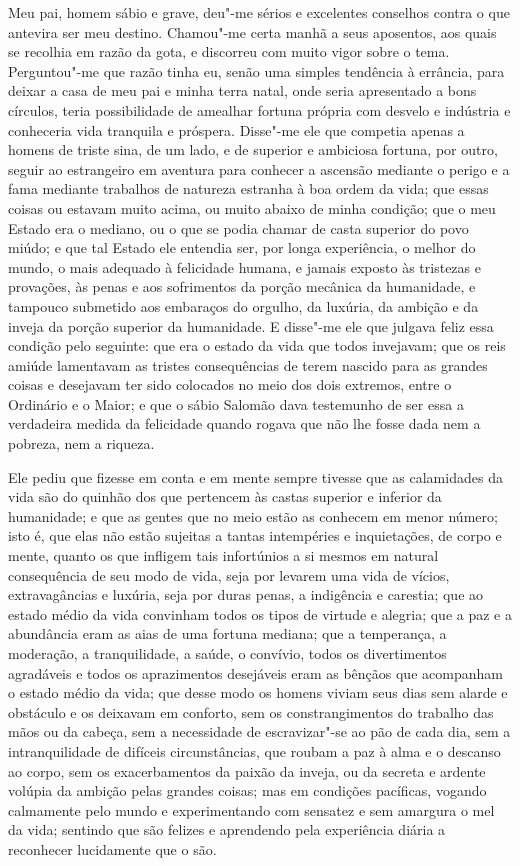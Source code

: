 Meu pai, homem sábio e grave, deu"-me sérios e excelentes conselhos
contra o que antevira ser meu destino. Chamou"-me certa manhã a seus
aposentos, aos quais se recolhia em razão da gota, e discorreu com muito
vigor sobre o tema. Perguntou"-me que razão tinha eu, senão uma simples
tendência à errância, para deixar a casa de meu pai e minha terra natal,
onde seria apresentado a bons círculos, teria possibilidade de amealhar
fortuna própria com desvelo e indústria e conheceria vida tranquila e
próspera. Disse"-me ele que competia apenas a homens de triste sina, de
um lado, e de superior e ambiciosa fortuna, por outro, seguir ao
estrangeiro em aventura para conhecer a ascensão mediante o perigo e a
fama mediante trabalhos de natureza estranha à boa ordem da vida; que
essas coisas ou estavam muito acima, ou muito abaixo de minha condição;
que o meu Estado era o mediano, ou o que se podia chamar de casta
superior do povo miúdo; e que tal Estado ele entendia ser, por longa
experiência, o melhor do mundo, o mais adequado à felicidade humana, e
jamais exposto às tristezas e provações, às penas e aos sofrimentos da
porção mecânica da humanidade, e tampouco submetido aos embaraços do
orgulho, da luxúria, da ambição e da inveja da porção superior da
humanidade. E disse"-me ele que julgava feliz essa condição pelo
seguinte: que era o estado da vida que todos invejavam; que os reis
amiúde lamentavam as tristes consequências de terem nascido para as
grandes coisas e desejavam ter sido colocados no meio dos dois extremos,
entre o Ordinário e o Maior; e que o sábio Salomão dava testemunho de
ser essa a verdadeira medida da felicidade quando rogava que não lhe
fosse dada nem a pobreza, nem a riqueza.

Ele pediu que fizesse em conta e em mente sempre tivesse que as
calamidades da vida são do quinhão dos que pertencem às castas superior
e inferior da humanidade; e que as gentes que no meio estão as conhecem
em menor número; isto é, que elas não estão sujeitas a tantas
intempéries e inquietações, de corpo e mente, quanto os que infligem
tais infortúnios a si mesmos em natural consequência de seu modo de
vida, seja por levarem uma vida de vícios, extravagâncias e luxúria,
seja por duras penas, a indigência e carestia; que ao estado médio da
vida convinham todos os tipos de virtude e alegria; que a paz e a
abundância eram as aias de uma fortuna mediana; que a temperança, a
moderação, a tranquilidade, a saúde, o convívio, todos os divertimentos
agradáveis e todos os aprazimentos desejáveis eram as bênçãos que
acompanham o estado médio da vida; que desse modo os homens viviam seus
dias sem alarde e obstáculo e os deixavam em conforto, sem os
constrangimentos do trabalho das mãos ou da cabeça, sem a necessidade de
escravizar"-se ao pão de cada dia, sem a intranquilidade de difíceis
circunstâncias, que roubam a paz à alma e o descanso ao corpo, sem os
exacerbamentos da paixão da inveja, ou da secreta e ardente volúpia da
ambição pelas grandes coisas; mas em condições pacíficas, vogando
calmamente pelo mundo e experimentando com sensatez e sem amargura o mel
da vida; sentindo que são felizes e aprendendo pela experiência diária a
reconhecer lucidamente que o são.

